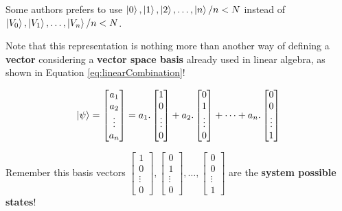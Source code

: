 			\par Some authors prefers to use $\ket{0}, \ket{1}, \ket{2}, \dots , \ket{n} / n < N$ instead of $\ket{V_0},\ket{V_1}, \dots, \ket{V_n} / n < N$.\newline

			\par Note that this representation is nothing more than another way of defining a \textbf{vector} considering a \textbf{vector space basis} already used in linear algebra, as shown in Equation \ref{eq:linearCombination}!\newline
			
			\begin{equation}
				\label{eq:linearCombination}
				\begin{aligned}
					\ket{\psi} =
					\begin{bmatrix}
						a_{1} \\
						a_{2} \\
						\vdots \\
						a_{n}
					\end{bmatrix} =
					a_1 . \begin{bmatrix}
						1\\
						0\\
						\vdots \\
						0
					\end{bmatrix}+
					a_2 . \begin{bmatrix}
						0\\
						1\\
						\vdots \\
						0
					\end{bmatrix}+
					\dots + a_n . \begin{bmatrix}
						0\\
						0\\
						\vdots \\
						1
					\end{bmatrix}
				\end{aligned}
			\end{equation}
		
			\par Remember this basis vectors $
			\begin{bmatrix}
				1\\
				0\\
				\vdots \\
				0
			\end{bmatrix}, 
			\begin{bmatrix}
				0\\
				1\\
				\vdots \\
				0
			\end{bmatrix}, \dots,
			\begin{bmatrix}
				0\\
				0\\
				\vdots \\
				1
			\end{bmatrix}$ are the \textbf{system possible states}!
		
